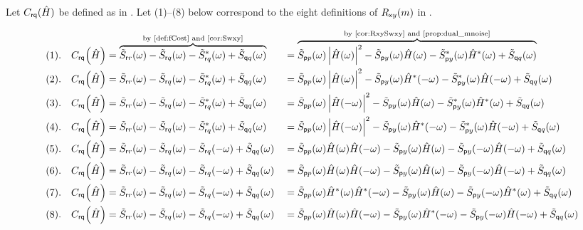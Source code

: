 \begin{lemma}
\label{lem:H1LS_cost}
Let $C_{\mathsf{rq}}(\hat{H})$ be defined as in .
Let (1)--(8) below correspond to the eight definitions of $R_{{\mathsf xy}}(m)$ in .
\begin{small}
\begin{align*}
  (1).\quad\fCostrq\brp{\estH}
     &= \ocom{\Swrr(\omega)- \Swrq(\omega) - \Swrq^\ast(\omega) + \Swqq(\omega)}
             {by \pref{def:fCost} and \prefp{cor:Swxy}}
    &&= \ocom{
        \Swpp(\omega)\abs{\estH(\omega)}^2
      - \Swpy(\omega)\estH(\omega)
      - \Swpy^\ast(\omega)\estH^\ast(\omega)
      + \Swqq(\omega)
      }{by \prefp{cor:RxySwxy} and \prefp{prop:dual_mnoise}}
    \\
  (2).\quad\fCostrq\brp{\estH}
     &= \Swrr(\omega)- \Swrq(\omega) - \Swrq^\ast(\omega) + \Swqq(\omega)
    &&= \Swpp(\omega)\abs{\estH(\omega)}^2
      - \Swpy(\omega)\estH^\ast(-\omega)
      - \Swpy^\ast(\omega)\estH(-\omega)
      + \Swqq(\omega)
    \\
  (3).\quad\fCostrq\brp{\estH}
     &= \Swrr(\omega)- \Swrq(\omega) - \Swrq^\ast(\omega) + \Swqq(\omega)
    &&= \Swpp(\omega)\abs{\estH(-\omega)}^2
      - \Swpy(\omega)\estH(\omega)
      - \Swpy^\ast(\omega)\estH^\ast(\omega)
      + \Swqq(\omega)
    \\
  (4).\quad\fCostrq\brp{\estH}
     &= \Swrr(\omega)- \Swrq(\omega) - \Swrq^\ast(\omega) + \Swqq(\omega)
    &&= \Swpp(\omega)\abs{\estH(-\omega)}^2
      - \Swpy(\omega)\estH^\ast(-\omega)
      - \Swpy^\ast(\omega)\estH(-\omega)
      + \Swqq(\omega)
    \\
  (5).\quad\fCostrq\brp{\estH}
     &= \Swrr(\omega)- \Swrq(\omega) - \Swrq(-\omega) + \Swqq(\omega)
    &&= \Swpp(\omega)\estH(\omega)\estH(-\omega)
      - \Swpy(\omega)\estH(\omega)
      - \Swpy(-\omega)\estH(-\omega)
      + \Swqq(\omega)
    \\
  (6).\quad\fCostrq\brp{\estH}
     &= \Swrr(\omega)- \Swrq(\omega) - \Swrq(-\omega) + \Swqq(\omega)
    &&= \Swpp(\omega)\estH(\omega)\estH(-\omega)
      - \Swpy(\omega)\estH(\omega)
      - \Swpy(-\omega)\estH(-\omega)
      + \Swqq(\omega)
    \\
  (7).\quad\fCostrq\brp{\estH}
     &= \Swrr(\omega)- \Swrq(\omega) - \Swrq(-\omega) + \Swqq(\omega)
    &&= \Swpp(\omega)\estH^\ast(\omega)\estH^\ast(-\omega)
      - \Swpy(\omega)\estH(\omega)
      - \Swpy(-\omega)\estH^\ast(\omega)
      + \Swqq(\omega)
    \\
  (8).\quad\fCostrq\brp{\estH}
     &= \Swrr(\omega)- \Swrq(\omega) - \Swrq(-\omega) + \Swqq(\omega)
    &&= \Swpp(\omega)\estH(\omega)\estH(-\omega)
      - \Swpy(\omega)\estH^\ast(-\omega)
      - \Swpy(-\omega)\estH(-\omega)
      + \Swqq(\omega)
\end{align*}
\end{small}
\end{lemma}

